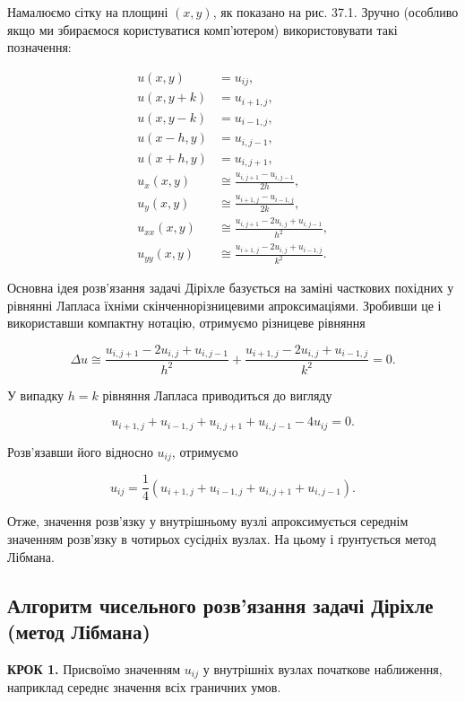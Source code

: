 \documentclass[
  ukrainian,
]{article}
\begin{document}
Намалюємо сітку на площині \((x,y)\), як показано на рис. 37.1. Зручно
(особливо якщо ми збираємося користуватися комп'ютером) використовувати
такі позначення:

\[
\begin{aligned}u(x,y)&=u_{ij},\\u(x,y+k)&=u_{i+1,j},\\u(x,y-k)&=u_{i-1,j},\\u(x-h,y)&=u_{i,j-1},\\u(x+h,y)&=u_{i,j+1},\\u_x(x,y)&\cong \frac{u_{i,j+1}-u_{i,j-1}}{2h},\\u_y(x,y)&\cong \frac{u_{i+1,j}-u_{i-1,j}}{2k},\\u_{xx}(x,y)&\cong \frac{u_{i,j+1}-2u_{i,j}+u_{i,j-1}}{h^2},\\u_{yy}(x,y)&\cong \frac{u_{i+1,j}-2u_{i,j}+u_{i-1,j}}{k^2}.\end{aligned}
\]

Основна ідея розв'язання задачі Діріхле базується на заміні часткових
похідних у рівнянні Лапласа їхніми скінченнорізницевими апроксимаціями.
Зробивши це і використавши компактну нотацію, отримуємо різницеве
рівняння

\[
\Delta u \cong\frac{u_{i,j+1}-2u_{i,j}+u_{i,j-1}}{h^2}+\frac{u_{i+1,j}-2u_{i,j}+u_{i-1,j}}{k^2}=0.
\]

У випадку \(h=k\) рівняння Лапласа приводиться до вигляду

\[
u_{i+1,j}+u_{i-1,j}+u_{i,j+1}+u_{i,j-1}-4u_{ij}=0.
\]

Розв'язавши його відносно \(u_{ij}\), отримуємо

\[
u_{ij}=\frac{1}{4}\left(u_{i+1,j}+u_{i-1,j}+u_{i,j+1}+u_{i,j-1}\right).
\]

Отже, значення розв'язку у внутрішньому вузлі апроксимується середнім
значенням розв'язку в чотирьох сусідніх вузлах. На цьому і ґрунтується
метод Лібмана.

\subsection{Алгоритм чисельного розв'язання задачі Діріхле (метод
Лібмана)}\label{ux430ux43bux433ux43eux440ux438ux442ux43c-ux447ux438ux441ux435ux43bux44cux43dux43eux433ux43e-ux440ux43eux437ux432ux44fux437ux430ux43dux43dux44f-ux437ux430ux434ux430ux447ux456-ux434ux456ux440ux456ux445ux43bux435-ux43cux435ux442ux43eux434-ux43bux456ux431ux43cux430ux43dux430}

\textbf{КРОК 1.} Присвоїмо значенням \(u_{ij}\) у внутрішніх вузлах
початкове наближення, наприклад середнє значення всіх граничних умов.
\end{document}
